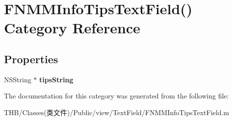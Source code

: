 \hypertarget{category_f_n_m_m_info_tips_text_field_07_08}{}\section{F\+N\+M\+M\+Info\+Tips\+Text\+Field() Category Reference}
\label{category_f_n_m_m_info_tips_text_field_07_08}
\subsection*{Properties}
\begin{DoxyCompactItemize}
\item 
\mbox{\label{category_f_n_m_m_info_tips_text_field_07_08_a22cc9b8a97a176b931103cd358691569}} 
N\+S\+String $\ast$ {\bfseries tips\+String}
\end{DoxyCompactItemize}


The documentation for this category was generated from the following file\+:\begin{DoxyCompactItemize}
\item 
T\+H\+B/\+Classes(类文件)/\+Public/view/\+Text\+Field/F\+N\+M\+M\+Info\+Tips\+Text\+Field.\+m\end{DoxyCompactItemize}
